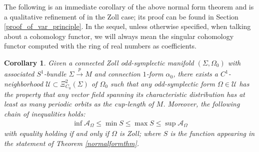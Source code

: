 \documentclass[11pt]{amsart}
\theoremstyle{plain}
\newtheorem{corollary}[theorem]{Corollary}
\theoremstyle{definition}
\theoremstyle{remark}
\begin{document}
The following is an immediate corollary of the above normal form theorem and is a qualitative refinement of \cite[Theorem 3.10]{Kerman} in the Zoll case; its proof can be found in Section \ref{proof_of_var_principle}. In the sequel, unless otherwise specified, when talking about a cohomology functor, we will always mean the singular cohomology functor computed with the ring of real numbers as coefficients.
\begin{corollary}\label{variationalprinciple}
Given a connected Zoll odd-symplectic manifold $(\Sigma,\Omega_0)$ with associated $S^1$-bundle $\Sigma \xrightarrow{p} M$ and connection $1$-form $\alpha_0$, there exists a $C^1$-neighborhood $\mathcal{U} \subset \Xi_{C_0}^2(\Sigma)$ of $\Omega_0$ such that any odd-symplectic form $\Omega \in \mathcal{U}$ has the property that any vector field spanning its characteristic distribution has at least as many periodic orbits as the cup-length of $M$. Moreover, the following chain of inequalities holds:
\begin{align}\label{var_principle_eqns}
    \inf\mathcal{A}_{\Omega} \leq \min S \leq \max S \leq \sup\mathcal{A}_{\Omega} 
\end{align}
with equality holding if and only if $\Omega$ is Zoll; where $S$ is the function appearing in the statement of Theorem \ref{normalformthm}.
\end{corollary}
\end{document}
